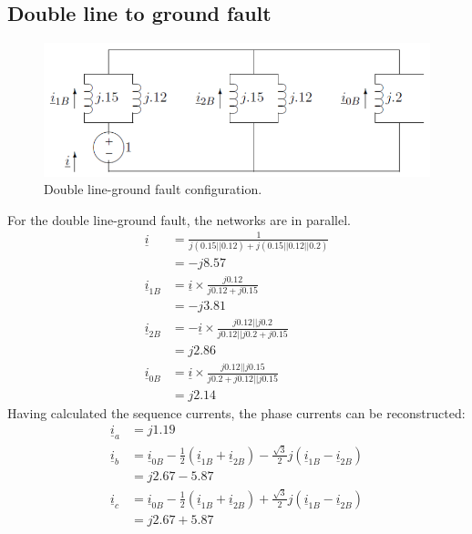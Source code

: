 \subsection{Double line to ground fault}
\begin{figure}[H]
	\centering
	\includegraphics[width = \textwidth]{./img/figure43.png}
	\caption{Double line-ground fault configuration.}
\end{figure}
For the double line-ground fault, the networks are in parallel.
\begin{align}
	\underline{i}      & = \frac{1}{j\left(0.15||0.12\right)+ j \left(0.15||0.12||0.2\right)} \\
	                   & = -j8.57                                                             \\
	\underline{i}_{1B} & = \underline{i} \times \frac{j0.12}{j0.12 + j0.15}                   \\
	                   & = -j3.81                                                             \\
	\underline{i}_{2B} & = -\underline{i} \times \frac{j0.12 ||j0.2}{j0.12||j0.2 + j0.15}     \\
	                   & = j2.86                                                              \\
	\underline{i}_{0B} & = \underline{i}\times \frac{j0.12||j0.15}{j0.2 + j0.12||j0.15}       \\
	                   & = j2.14
\end{align}
Having calculated the sequence currents, the phase currents can be reconstructed:
\begin{align}
	\underline{i}_a & = j1.19                                                                                                                                                          \\
	\underline{i}_b & = \underline{i}_{0B} - \frac{1}{2}\left(\underline{i}_{1B} + \underline{i}_{2B}\right)-\frac{\sqrt{3}}{2}j\left(\underline{i}_{1B} - \underline{i}_{2B}\right)   \\
	                & = j2.67 - 5.87                                                                                                                                                   \\
	\underline{i}_c & = \underline{i}_{0B} - \frac{1}{2}\left(\underline{i}_{1B}+\underline{i}_{2B}\right) + \frac{\sqrt{3}}{2} j \left(\underline{i}_{1B} - \underline{i}_{2B}\right) \\
	                & = j2.67 + 5.87
\end{align}
